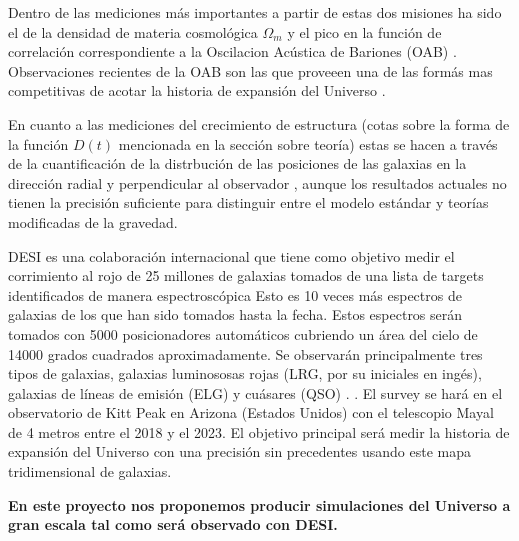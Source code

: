 Dentro de las mediciones m\'as importantes a partir de estas dos misiones
ha sido el de la densidad de materia cosmol\'ogica $\Omega_m$
\cite{2001Natur.410..169P} y el pico en la funci\'on de
correlaci\'on correspondiente a la Oscilacion Ac\'ustica de Bariones
(OAB) \cite{Eisenstein2005}. 
Observaciones recientes de la OAB son las que proveeen una de las
form\'as mas competitivas de acotar la historia de expansi\'on del
Universo \cite{2014MNRAS.441...24A}. 

En cuanto a las mediciones del crecimiento de estructura (cotas sobre
la forma de la funci\'on $D(t)$ mencionada en la secci\'on sobre
teor\'ia) estas se hacen a trav\'es de la cuantificaci\'on de la
distrbuci\'on de las posiciones de las galaxias en la direcci\'on
radial y perpendicular al observador \cite{2014MNRAS.439.3504S},
aunque los resultados actuales no tienen la precisión suficiente 
para distinguir entre el modelo est\'andar y teor\'ias
modificadas de la gravedad. 

DESI es una colaboraci\'on internacional que tiene como objetivo medir
el corrimiento al rojo de 25 millones de galaxias tomados de una lista
de targets identificados de manera espectrosc\'opica
Esto es 10 veces m\'as espectros de galaxias de los que han sido
tomados hasta la fecha.
Estos espectros ser\'an tomados con 5000 posicionadores autom\'aticos
cubriendo un \'area del cielo de 14000 grados cuadrados
aproximadamente. 
Se observar\'an principalmente tres tipos de galaxias, galaxias
luminososas rojas (LRG, por su iniciales en ing\'es), galaxias de
l\'ineas de emisi\'on (ELG) y cu\'asares (QSO) \cite{2015AAS...22533610C}. .
El survey se har\'a  en el observatorio de Kitt Peak en Arizona
(Estados Unidos) con el telescopio Mayal de 4 metros entre el 2018 y
el 2023. 
El objetivo principal ser\'a medir la historia de expansi\'on del
Universo con una precisi\'on sin precedentes usando este mapa
tridimensional de galaxias. 

{\bf En este proyecto nos proponemos producir simulaciones del
  Universo a gran escala tal como ser\'a observado con DESI.}




